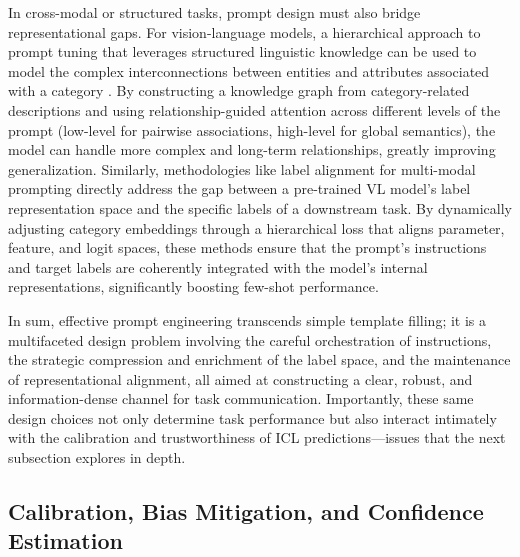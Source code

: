 \documentclass[11pt]{article}
\begin{document}
In cross-modal or structured tasks, prompt design must also bridge representational gaps. For vision-language models, a hierarchical approach to prompt tuning that leverages structured linguistic knowledge can be used to model the complex interconnections between entities and attributes associated with a category \cite{ref86}. By constructing a knowledge graph from category-related descriptions and using relationship-guided attention across different levels of the prompt (low-level for pairwise associations, high-level for global semantics), the model can handle more complex and long-term relationships, greatly improving generalization. Similarly, methodologies like label alignment for multi-modal prompting \cite{ref87} directly address the gap between a pre-trained VL model's label representation space and the specific labels of a downstream task. By dynamically adjusting category embeddings through a hierarchical loss that aligns parameter, feature, and logit spaces, these methods ensure that the prompt's instructions and target labels are coherently integrated with the model's internal representations, significantly boosting few-shot performance.

In sum, effective prompt engineering transcends simple template filling; it is a multifaceted design problem involving the careful orchestration of instructions, the strategic compression and enrichment of the label space, and the maintenance of representational alignment, all aimed at constructing a clear, robust, and information-dense channel for task communication. Importantly, these same design choices not only determine task performance but also interact intimately with the calibration and trustworthiness of ICL predictions---issues that the next subsection explores in depth.

\subsection{Calibration, Bias Mitigation, and Confidence Estimation}
\end{document}
